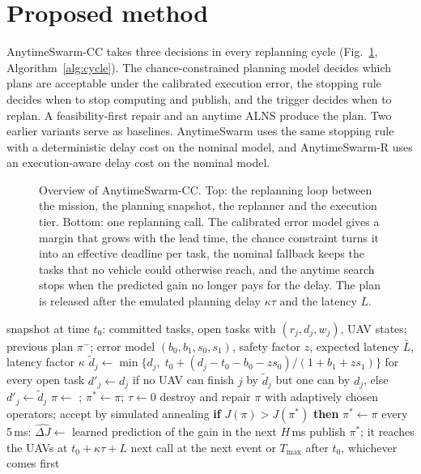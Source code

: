 \section{Proposed method}\label{sec:method}
AnytimeSwarm-CC takes three decisions in every replanning cycle (Fig.~\ref{fig:overview}, Algorithm~\ref{alg:cycle}).
The chance-constrained planning model decides which plans are acceptable under the calibrated execution error, the
stopping rule decides when to stop computing and publish, and the trigger decides when to replan. A feasibility-first
repair and an anytime ALNS produce the plan. Two earlier variants serve as baselines. AnytimeSwarm uses the same
stopping rule with a deterministic delay cost on the nominal model, and AnytimeSwarm-R uses an execution-aware delay
cost on the nominal model.

\begin{figure}[t]
\centering
{}
\caption{Overview of AnytimeSwarm-CC. Top: the replanning loop between the mission, the planning snapshot, the
replanner and the execution tier. Bottom: one replanning call. The calibrated error model gives a margin that grows
with the lead time, the chance constraint turns it into an effective deadline per task, the nominal fallback keeps the
tasks that no vehicle could otherwise reach, and the anytime search stops when the predicted gain no longer pays for the
delay. The plan is released after the emulated planning delay $\kappa\tau$ and the latency $L$.}\label{fig:overview}
\end{figure}

\begin{algorithm}[t]
\caption{One replanning call of AnytimeSwarm-CC}\label{alg:cycle}
\small
\begin{algorithmic}[1]
\Require snapshot at time $t_0$: committed tasks, open tasks with $(r_j,d_j,w_j)$, UAV states; previous plan $\pi^-$;
error model $(b_0,b_1,s_0,s_1)$, safety factor $z$, expected latency $\bar L$, latency factor $\kappa$
\State $\tilde d_j \gets \min\{d_j,\; t_0+(d_j-t_0-b_0-z s_0)/(1+b_1+z s_1)\}$ for every open task
\State $d'_j \gets d_j$ if no UAV can finish $j$ by $\tilde d_j$ but one can by $d_j$, else $d'_j\gets\tilde d_j$
\State $\pi \gets$ ;\; $\pi^\ast \gets \pi$;\; $\tau \gets 0$
\Repeat
  \State destroy and repair $\pi$ with adaptively chosen operators; accept by simulated annealing
  \State \textbf{if} $J(\pi) > J(\pi^\ast)$ \textbf{then} $\pi^\ast \gets \pi$
  \State every 5\,ms: $\widehat{\Delta J} \gets$ learned prediction of the gain in the next $H$\,ms
 
\State publish $\pi^\ast$; it reaches the UAVs at $t_0+\kappa\tau+L$
\State next call at the next event or $T_{\max}$ after $t_0$, whichever comes first
\end{algorithmic}
\end{algorithm}


